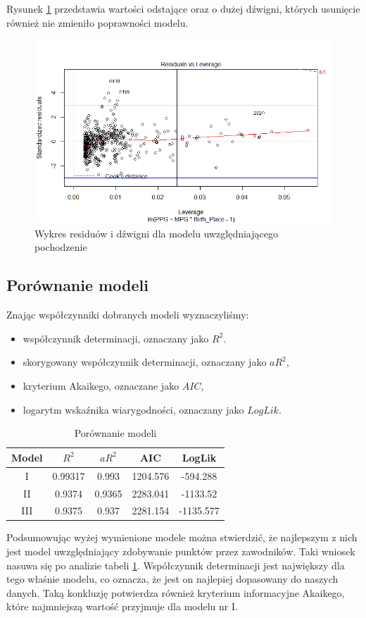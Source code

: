 \documentclass[11pt,a4paper]{article}
\begin{document}
Rysunek \ref{leverage_origin} przedstawia wartości odstające oraz o dużej dźwigni, których usunięcie również nie zmieniło poprawności modelu.
\begin{figure}[t]
\includegraphics[width=\textwidth]{origin_4}
\caption{Wykres residuów i dźwigni dla modelu uwzględniającego pochodzenie}
\label{leverage_origin}
\centering
\end{figure}

\subsection{Porównanie modeli}
Znając współczynniki dobranych modeli wyznaczyliśmy:
\begin{itemize}
	\item współczynnik determinacji, oznaczany jako $R^2$.
	\item skorygowany współczynnik determinacji, oznaczany jako $aR^2$,
	\item kryterium Akaikego, oznaczane jako $AIC$,
	\item logarytm wskaźnika wiarygodności, oznaczany jako $LogLik$.
\end{itemize}

\begin{table}[H]
	\begin{center}
		\begin{tabular}{| c | c | c | c | c |}
			\hline
			Model & $R^2$ & $aR^2$ & AIC & LogLik \\ \hline
			I & 0.99317 & 0.993 & 1204.576 & -594.288\\ \hline
			II & 0.9374 & 0.9365 & 2283.041 & -1133.52\\ \hline 
			III & 0.9375 & 0.937 & 2281.154 & -1135.577\\ \hline  
		\end{tabular}
		\caption{Porównanie modeli}
		\label{porownanie_modeli}
	\end{center}
\end{table}
Podsumowując wyżej wymienione modele można stwierdzić, że najlepszym z nich jest model uwzględniający zdobywanie punktów przez zawodników. Taki wniosek nasuwa się po analizie tabeli \ref{porownanie_modeli}. Współczynnik determinacji jest największy dla tego właśnie modelu, co oznacza, że jest on najlepiej dopasowany do naszych danych. Taką konkluzję potwierdza również kryterium informacyjne Akaikego, które najmniejszą wartość przyjmuje dla modelu nr I.
\end{document}
